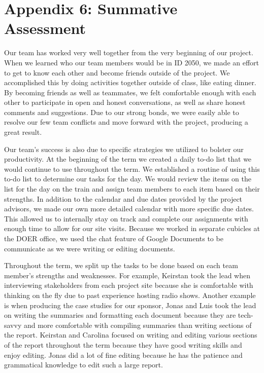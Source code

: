 \section*{Appendix 6: Summative Assessment}
\par Our team has worked very well together from the very beginning of our project. When we learned who our team members would be in ID 2050, we made an effort to get to know each other and become friends outside of the project. We accomplished this by doing activities together outside of class, like eating dinner. By becoming friends as well as teammates, we felt comfortable enough with each other to participate in open and honest conversations, as well as share honest comments and suggestions. Due to our strong bonds, we were easily able to resolve our few team conflicts and move forward with the project, producing a great result.
\par Our team's success is also due to specific strategies we utilized to bolster our productivity. At the beginning of the term we created a daily to-do list that we would continue to use throughout the term. We established a routine of using this to-do list to determine our tasks for the day. We would review the items on the list for the day on the train and assign team members to each item based on their strengths. In addition to the calendar and due dates provided by the project advisors, we made our own more detailed calendar with more specific due dates. This allowed us to internally stay on track and complete our assignments with enough time to allow for our site visits. Because we worked in separate cubicles at the DOER office, we used the chat feature of Google Documents to be communicate as we were writing or editing documents. 
\par Throughout the term, we split up the tasks to be done based on each team member's strengths and weaknesses. For example, Keirstan took the lead when interviewing stakeholders from each project site because she is comfortable with thinking on the fly due to past experience hosting radio shows. Another example is when producing the case studies for our sponsor, Jonas and Luis took the lead on writing the summaries and formatting each document because they are tech-savvy and more comfortable with compiling summaries than writing sections of the report. Keirstan and Carolina focused on writing and editing various sections of the report throughout the term because they have good writing skills and enjoy editing. Jonas did a lot of fine editing because he has the patience and grammatical knowledge to edit such a large report.
